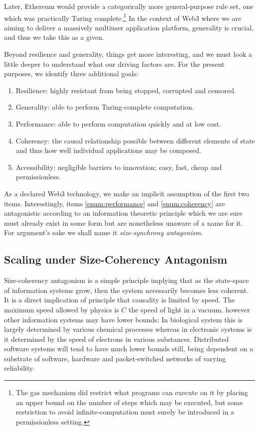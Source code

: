 Later, Ethereum would provide a categorically more general-purpose rule set, one which was practically Turing complete.\footnote{The gas mechanism did restrict what programs can execute on it by placing an upper bound on the number of steps which may be executed, but some restriction to avoid infinite-computation must surely be introduced in a permissionless setting.} In the context of Web3 where we are aiming to deliver a massively multiuser application platform, generality is crucial, and thus we take this as a given.

Beyond resilience and generality, things get more interesting, and we must look a little deeper to understand what our driving factors are. For the present purposes, we identify three additional goals:
\begin{enumerate}
  \item \label{enum:resilience} Resilience: highly resistant from being stopped, corrupted and censored.
  \item \label{enum:generality} Generality: able to perform Turing-complete computation.
  \item \label{enum:performance} Performance: able to perform computation quickly and at low cost.
  \item \label{enum:coherency} Coherency: the causal relationship possible between different elements of state and thus how well individual applications may be composed.
  \item \label{enum:accessibility} Accessibility: negligible barriers to innovation; easy, fast, cheap and permissionless.
\end{enumerate}

As a declared Web3 technology, we make an implicit assumption of the first two items. Interestingly, items \ref{enum:performance} and \ref{enum:coherency} are antagonistic according to an information theoretic principle which we are sure must already exist in some form but are nonetheless unaware of a name for it. For argument's sake we shall name it \emph{size-synchrony antagonism}.

\subsection{Scaling under Size-Coherency Antagonism}

Size-coherency antagonism is a simple principle implying that as the state-space of information systems grow, then the system necessarily becomes less coherent. It is a direct implication of principle that causality is limited by speed. The maximum speed allowed by physics is $C$ the speed of light in a vacuum, however other information systems may have lower bounds: In biological system this is largely determined by various chemical processes whereas in electronic systems is it determined by the speed of electrons in various substances. Distributed software systems will tend to have much lower bounds still, being dependent on a substrate of software, hardware and packet-switched networks of varying reliability.

